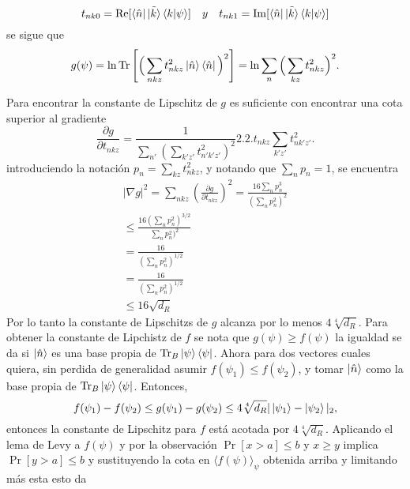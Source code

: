 \begin{equation}
t_{nk0}= \Re [ \bra{\hat{n}} \tilde{\ket{k}} \bra{k}\ket{\psi}] \quad y \quad  t_{nk1}= \Im [ \bra{\hat{n}} \tilde{\ket{k}} \bra{k}\ket{\psi}]
\end{equation}
se sigue que 
\begin{equation}
g(\psi)= \ln \Tr \Bigg[  \Big( \sum_{nkz} t_{nkz}^{2}  \ket{\hat{n}} \bra{\hat{n}}  \Big)^{2} \Bigg]= \ln \sum_{n} \Big( \sum_{kz} t_{nkz}^{2} \Big)^{2}.
\end{equation}

Para encontrar la constante de Lipschitz de $g$ es suficiente con encontrar una cota superior al gradiente 
\begin{equation}
\frac{\partial g}{\partial t_{nkz}}=\frac{1}{\sum_{n'} (\sum_{k'z'}t_{n'k'z'}^{2})^{2}} 2.2.t_{nkz} \sum_{k'z'}t_{nk'z'}^{2}.
\end{equation}
introduciendo la notación $p_{n}=\sum_{kz}t_{nkz}^{2}$, y notando que $\sum_{n} p_{n}=1$, se encuentra 
\begin{multline}
|\nabla g|^{2}= \sum_{nkz} (\frac{\partial g}{\partial t_{nkz}})^{2}= \frac{16 \sum_{n} p_{n}^{3}}{(\sum_{n} p_{n}^{2})^{2}}\\
\leq \frac{16(\sum_{n} p_{n}^{2})^{3/2}}{\sum_{n} p_{n}^{2})^{2}}\\
=\frac{16}{(\sum_{n} p_{n}^{2})^{1/2}}\\
=\frac{16}{(\sum_{n} p_{n}^{2})^{1/2}}\\
\leq 16 \sqrt{d_{R}}
\end{multline}
Por lo tanto la constante de Lipschitzs de $g$ alcanza por lo menos $4 \sqrt[4]{d_{R}}$. Para obtener la constante de Lipchistz de $f$ se nota que $g(\psi) \geq f(\psi)$ la igualdad se da si $ { \ket{ \hat{n}} }$ es una base  propia de $\Tr_{B} \ket{\psi}\bra{\psi}$. Ahora para dos vectores cuales quiera, sin perdida de generalidad asumir $f(\psi_{1}) \leq f(\psi_{2})$, y tomar ${ \ket{\hat{n}} }$ como la base propia de $\Tr_{B} \ket{\psi}\bra{\psi}$. Entonces,
\begin{equation}
f(\psi_{1})- f(\psi_{2})\leq g(\psi_{1})- g(\psi_{2}) \leq 4\sqrt[4]{d_{R}} |\ket{\psi_{1}}-\ket{\psi_{2}}|_{2},
\end{equation}
entonces la constante de Lipschitz para $f$ está acotada por $4\sqrt[4]{d_{R}}$.
Aplicando el lema de Levy a $f(\psi)$ y  por la observación $\Pr[x>a] \leq b$ y $x \geq y$ implica $\Pr[y>a] \leq b$ y sustituyendo la cota en $\langle f(\psi) \rangle_{\psi}$ obtenida arriba y limitando más esta 
esto da 

